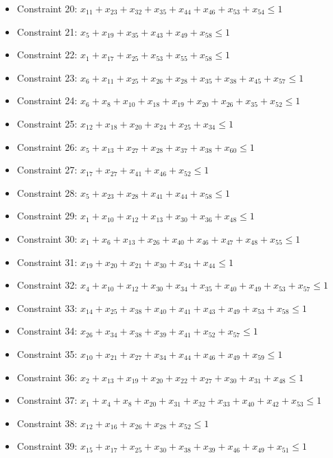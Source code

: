 \documentclass[11pt]{article}
\begin{document}
\begin{itemize}
\item Constraint 20: $x_{11} + x_{23} + x_{32} + x_{35} + x_{44} + x_{46} + x_{53} + x_{54} \le 1$
\item Constraint 21: $x_{5} + x_{19} + x_{35} + x_{43} + x_{49} + x_{58} \le 1$
\item Constraint 22: $x_{1} + x_{17} + x_{25} + x_{53} + x_{55} + x_{58} \le 1$
\item Constraint 23: $x_{6} + x_{11} + x_{25} + x_{26} + x_{28} + x_{35} + x_{38} + x_{45} + x_{57} \le 1$
\item Constraint 24: $x_{6} + x_{8} + x_{10} + x_{18} + x_{19} + x_{20} + x_{26} + x_{35} + x_{52} \le 1$
\item Constraint 25: $x_{12} + x_{18} + x_{20} + x_{24} + x_{25} + x_{34} \le 1$
\item Constraint 26: $x_{5} + x_{13} + x_{27} + x_{28} + x_{37} + x_{38} + x_{60} \le 1$
\item Constraint 27: $x_{17} + x_{27} + x_{41} + x_{46} + x_{52} \le 1$
\item Constraint 28: $x_{5} + x_{23} + x_{28} + x_{41} + x_{44} + x_{58} \le 1$
\item Constraint 29: $x_{1} + x_{10} + x_{12} + x_{13} + x_{30} + x_{36} + x_{48} \le 1$
\item Constraint 30: $x_{1} + x_{6} + x_{13} + x_{26} + x_{40} + x_{46} + x_{47} + x_{48} + x_{55} \le 1$
\item Constraint 31: $x_{19} + x_{20} + x_{21} + x_{30} + x_{34} + x_{44} \le 1$
\item Constraint 32: $x_{4} + x_{10} + x_{12} + x_{30} + x_{34} + x_{35} + x_{40} + x_{49} + x_{53} + x_{57} \le 1$
\item Constraint 33: $x_{14} + x_{25} + x_{38} + x_{40} + x_{41} + x_{43} + x_{49} + x_{53} + x_{58} \le 1$
\item Constraint 34: $x_{26} + x_{34} + x_{38} + x_{39} + x_{41} + x_{52} + x_{57} \le 1$
\item Constraint 35: $x_{10} + x_{21} + x_{27} + x_{34} + x_{44} + x_{46} + x_{49} + x_{59} \le 1$
\item Constraint 36: $x_{2} + x_{13} + x_{19} + x_{20} + x_{22} + x_{27} + x_{30} + x_{31} + x_{48} \le 1$
\item Constraint 37: $x_{1} + x_{4} + x_{8} + x_{20} + x_{31} + x_{32} + x_{33} + x_{40} + x_{42} + x_{53} \le 1$
\item Constraint 38: $x_{12} + x_{16} + x_{26} + x_{28} + x_{52} \le 1$
\item Constraint 39: $x_{15} + x_{17} + x_{25} + x_{30} + x_{38} + x_{39} + x_{46} + x_{49} + x_{51} \le 1$

\end{itemize}
\end{document}
